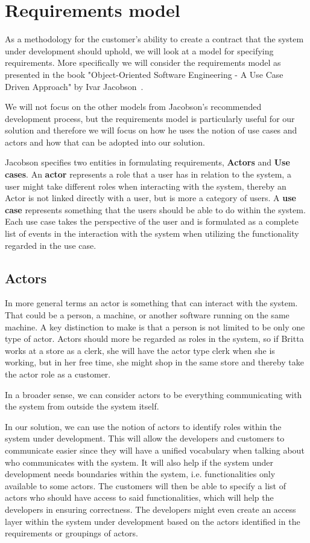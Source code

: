 \section{Requirements model}

As a methodology for the customer's ability to create a contract that the system under development should uphold, we will look at a model for specifying requirements.
More specifically we will consider the requirements model as presented in the book "Object-Oriented Software Engineering - A Use Case Driven Approach" by Ivar Jacobson~\cite{Jacobson1992}.

We will not focus on the other models from Jacobson's recommended development process, but the requirements model is particularly useful for our solution and therefore we will focus on how he uses the notion of use cases and actors and how that can be adopted into our solution.

Jacobson specifies two entities in formulating requirements, \textbf{Actors} and \textbf{Use cases}.
An \textbf{actor} represents a role that a user has in relation to the system, a user might take different roles when interacting with the system, thereby an Actor is not linked directly with a user, but is more a category of users.
A \textbf{use case} represents something that the users should be able to do within the system. Each use case takes the perspective of the user and is formulated as a complete list of events in the interaction with the system when utilizing the functionality regarded in the use case.

\subsection{Actors}
In more general terms an actor is something that can interact with the system. That could be a person, a machine, or another software running on the same machine. 
A key distinction to make is that a person is not limited to be only one type of actor.
Actors should more be regarded as roles in the system, so if Britta works at a store as a clerk, she will have the actor type clerk when she is working, but in her free time, she might shop in the same store and thereby take the actor role as a customer. 

In a broader sense, we can consider actors to be everything communicating with the system from outside the system itself.

In our solution, we can use the notion of actors to identify roles within the system under development.
This will allow the developers and customers to communicate easier since they will have a unified vocabulary when talking about who communicates with the system. 
It will also help if the system under development needs boundaries within the system, i.e. functionalities only available to some actors.
The customers will then be able to specify a list of actors who should have access to said functionalities, which will help the developers in ensuring correctness.
The developers might even create an access layer within the system under development based on the actors identified in the requirements or groupings of actors.


